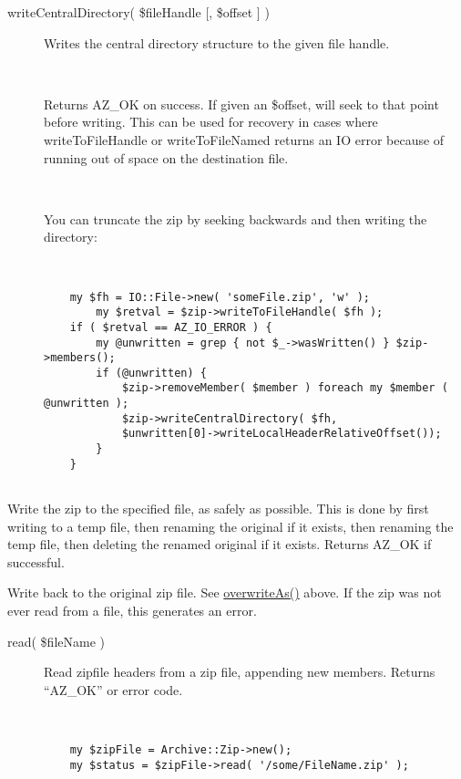 \documentclass[]{article}
\renewcommand{\emph}[1]{\underline{#1}}
\begin{document}
\begin{description}
\item[writeCentralDirectory( \$fileHandle {[}, \$offset {]} )]
Writes the central directory structure to the given file handle.

~

Returns AZ\_OK on success. If given an \$offset, will seek to that point
before writing. This can be used for recovery in cases where
writeToFileHandle or writeToFileNamed returns an IO error because of
running out of space on the destination file.

~

You can truncate the zip by seeking backwards and then writing the
directory:

~

\begin{verbatim}
    my $fh = IO::File->new( 'someFile.zip', 'w' );
        my $retval = $zip->writeToFileHandle( $fh );
    if ( $retval == AZ_IO_ERROR ) {
        my @unwritten = grep { not $_->wasWritten() } $zip->members();
        if (@unwritten) {
            $zip->removeMember( $member ) foreach my $member ( @unwritten );
            $zip->writeCentralDirectory( $fh,
            $unwritten[0]->writeLocalHeaderRelativeOffset());
        }
    }
    
\end{verbatim}
\end{description}

\begin{description}
\itemsep1pt\parskip0pt
\item[overwriteAs( \$newName )]
Write the zip to the specified file, as safely as possible. This is done
by first writing to a temp file, then renaming the original if it
exists, then renaming the temp file, then deleting the renamed original
if it exists. Returns AZ\_OK if successful.
\end{description}

\begin{description}
\itemsep1pt\parskip0pt
\item[\emph{overwrite()}]
Write back to the original zip file. See \emph{overwriteAs()} above. If
the zip was not ever read from a file, this generates an error.
\end{description}

\begin{description}
\item[read( \$fileName )]
Read zipfile headers from a zip file, appending new members. Returns
``AZ\_OK'' or error code.

~

\begin{verbatim}
    my $zipFile = Archive::Zip->new();
    my $status = $zipFile->read( '/some/FileName.zip' );
    
\end{verbatim}
\end{description}
\end{document}
